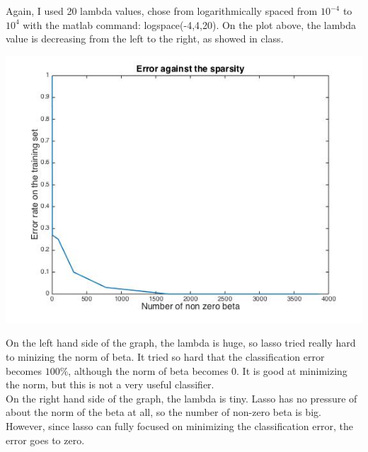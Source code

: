 \documentclass[paper=a4, fontsize=11pt]{scrartcl} %
\numberwithin{equation}{section} %
\numberwithin{figure}{section} %
\numberwithin{table}{section} %
\begin{document}
Again, I used 20 lambda values, chose from logarithmically spaced from $10^{-4}$ to $10^{4}$ with the matlab command: logspace(-4,4,20). On the plot above, the lambda value is decreasing from the left to the right, as showed in class. \\

\begin{center}
\includegraphics[scale=.5]{hw6_2c_err_spar.jpg}
\end{center}

On the left hand side of the graph, the lambda is huge, so lasso tried really hard to minizing the norm of beta. It tried so hard that the classification error becomes $100\%$, although the norm of beta becomes 0. It is good at minimizing the norm, but this is not a very useful classifier. \\ 

On the right hand side of the graph, the lambda is tiny. Lasso has no pressure of about the norm of the beta at all, so the number of non-zero beta is big. However, since lasso can fully focused on minimizing the classification error, the error goes to zero. 
\end{document}
